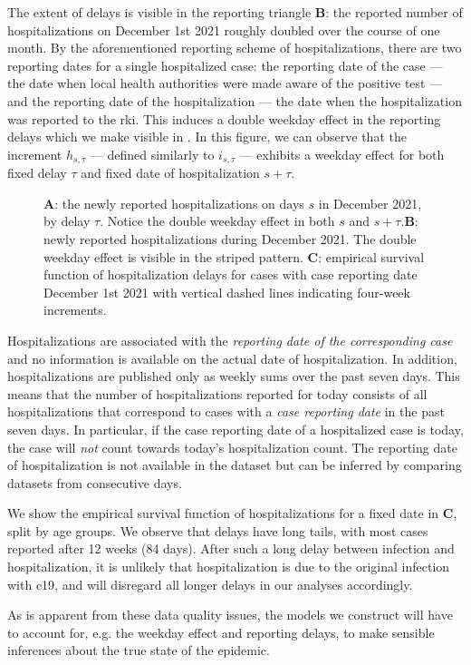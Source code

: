 The extent of delays is visible in the reporting triangle  \textbf{B}: the reported number of hospitalizations on December 1st 2021 roughly doubled over the course of one month. By the aforementioned reporting scheme of hospitalizations, there are two reporting dates for a single hospitalized case: the reporting date of the case --- the date when local health authorities were made aware of the positive test --- and the reporting date of the hospitalization --- the date when the hospitalization was reported to the \acrshort{rki}. This induces a double weekday effect in the reporting delays which we make visible in . 
In this figure, we can observe that the increment $h_{s,\tau}$ --- defined similarly to $i_{s,\tau}$ --- exhibits a weekday effect for both fixed delay $\tau$ and fixed date of hospitalization
$s + \tau$. 

\begin{figure}
    \resizebox{\textwidth}{!}{%
    }
    \caption{\textbf{A}: the newly reported hospitalizations on days $s$ in December 2021, by delay $\tau$. Notice the double weekday effect in both $s$ and $s+\tau$.\textbf{B}: newly reported hospitalizations during December 2021. The double weekday effect is visible in the striped pattern. \textbf{C}: empirical survival function of hospitalization delays for cases with case reporting date December 1st 2021 with vertical dashed lines indicating four-week increments.}
    \label{fig:double_weekday_effect_hosp}
\end{figure}

Hospitalizations are associated with the \emph{reporting date of the corresponding case} and no information is available on the actual date of hospitalization. In addition, hospitalizations are published only as weekly sums over the past seven days. This means that the number of hospitalizations reported for today consists of all hospitalizations that correspond to cases with a \emph{case reporting date} in the past seven days. In particular, if the case reporting date of a hospitalized case is today, the case will \emph{not} count towards today's hospitalization count. The reporting date of hospitalization is not available in the dataset but can be inferred by comparing datasets from consecutive days.

We show the empirical survival function of hospitalizations for a fixed date in  \textbf{C}, split by age groups. We observe that delays have long tails, with most cases reported after 12 weeks (84 days). After such a long delay between infection and hospitalization, it is unlikely that hospitalization is due to the original infection with \acrshort{c19}, and will disregard all longer delays in our analyses accordingly. 

As is apparent from these data quality issues, the models we construct will have to account for, e.g. the weekday effect and reporting delays, to make sensible inferences about the true state of the epidemic. 